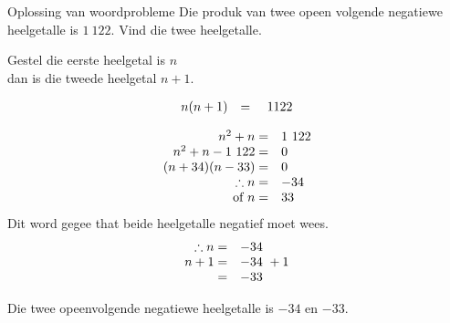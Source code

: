 \begin{wex}
{Oplossing van woordprobleme}
{
Die produk van twee opeen volgende negatiewe heelgetalle is $1~122$. Vind die twee heelgetalle.
} 
{
Gestel die eerste heelgetal is $n$ 
\\dan is die tweede heelgetal $n+1$.\par 

\begin{equation*}
\begin{array}{cll}\hfill n(n+1)& =& ~1122\hfill \end{array}
\end{equation*}

\begin{equation*}
    \begin{array}{cll}
	\hfill n^{2} + n =& 1~122\hfill \\
\hfill n^{2} + n - 1~122 =& 0\hfill \\
\hfill (n+34)(n-33) =& 0\hfill \\
	\hfill \therefore  n =& -34 \hfill \\
\hfill \mbox{ of } n =& 33\hfill 
    \end{array}
\end{equation*}
Dit word gegee that beide heelgetalle negatief moet wees.
\begin{equation*}
    \begin{array}{cll}
	\hfill \therefore n =& -34\hfill \\
\hfill n + 1 =& -34\ + 1 \hfill \\
\hfill  =& -33\hfill \\

    \end{array}
\end{equation*}

Die twee opeenvolgende negatiewe heelgetalle is $-34$ en $-33$.
}
\end{wex}

